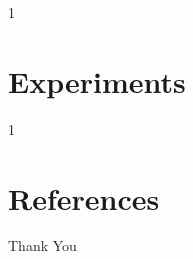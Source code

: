 \documentclass{beamer}
\begin{document}
\begin{frame}
	1
\end{frame}

\section{Experiments}

\begin{frame}
	1
\end{frame}


\section{References}
\begin{frame}[allowframebreaks]
	
	
	\nocite{*} %
\end{frame}


\begin{frame}
    \begin{center}
        {Thank You}
    \end{center}
\end{frame}
\end{document}
